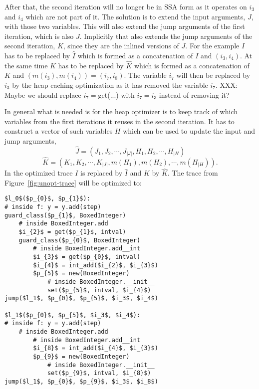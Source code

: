 \documentclass[preprint]{sigplanconf}
\begin{document}
After that, the second
iteration will no longer be in SSA form as it operates on $i_3$ and $i_4$
which are not part of it. The solution is to extend the input
arguments, $J$, with those two variables. This will also extend the
jump arguments of the first iteration, which is also $J$. 
Implicitly that also extends the jump arguments of the second iteration, $K$,
since they are the inlined versions of $J$. For the example $I$ has to
be replaced by $\hat I$ which is formed as a concatenation of $I$ and
$\left(i_3, i_4\right)$. At the same time $K$ has to be replaced by
$\hat K$ which is formed as a concatenation of $K$ and 
$\left(m\left(i_3\right), m\left(i_4\right)\right) = \left(i_7, i_8\right)$. 
The variable $i_7$ will then be replaced by $i_3$ by the heap caching
optimization as it has removed the variable $i_7$. XXX: Maybe we should
replace $i_7=$get(...) with $i_7=i_3$ instead of removing it?

In general what is needed is for the heap optimizer is to keep track of
which variables from the first iterations it reuses in the second
iteration. It has to construct a vector of such variables $H$ which
can be used to update the input and jump arguments,
\begin{equation}
  \hat J = \left(J_1, J_2, \cdots, J_{|J|}, H_1, H_2, \cdots, H_{|H}\right)
\end{equation}
\begin{equation}
  \hat K = \left(K_1, K_2, \cdots, K_{|J|}, m(H_1), m(H_2), \cdots, m(H_{|H})\right)
  .
\end{equation}
In the optimized trace $I$ is replaced by $\hat I$ and $K$ by $\hat
K$. The trace from Figure~\ref{fig:unopt-trace} will be optimized to:

\begin{lstlisting}[mathescape,numbers = right,basicstyle=\setstretch{1.05}\ttfamily\scriptsize]
$l_0$($p_{0}$, $p_{1}$):
# inside f: y = y.add(step)
guard_class($p_{1}$, BoxedInteger)
    # inside BoxedInteger.add
    $i_{2}$ = get($p_{1}$, intval)
    guard_class($p_{0}$, BoxedInteger)
        # inside BoxedInteger.add__int
        $i_{3}$ = get($p_{0}$, intval)
        $i_{4}$ = int_add($i_{2}$, $i_{3}$)
        $p_{5}$ = new(BoxedInteger)
            # inside BoxedInteger.__init__
            set($p_{5}$, intval, $i_{4}$)
jump($l_1$, $p_{0}$, $p_{5}$, $i_3$, $i_4$)

$l_1$($p_{0}$, $p_{5}$, $i_3$, $i_4$):
# inside f: y = y.add(step)
    # inside BoxedInteger.add
        # inside BoxedInteger.add__int
        $i_{8}$ = int_add($i_{4}$, $i_{3}$)
        $p_{9}$ = new(BoxedInteger)
            # inside BoxedInteger.__init__
            set($p_{9}$, intval, $i_{8}$)
jump($l_1$, $p_{0}$, $p_{9}$, $i_3$, $i_8$)
\end{lstlisting}
\end{document}
